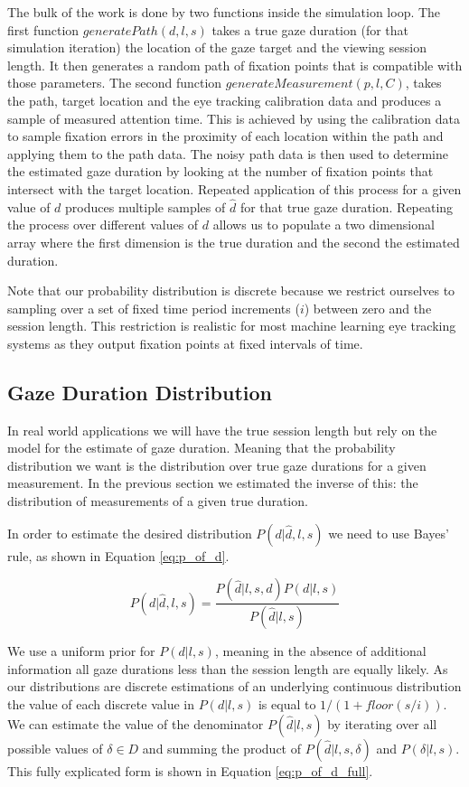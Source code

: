 \documentclass[sigconf]{acmart}
\numberwithin{equation}{section}
\begin{document}
The bulk of the work is done by two functions inside the simulation loop. The first function
$generatePath(d,l,s)$ takes a true gaze duration (for that simulation iteration) the location
of the gaze target and the viewing session length. It then
generates a random path of fixation points that is compatible with those parameters.
The second function 
$generateMeasurement(p,l,C)$, takes the path, target location and the eye tracking calibration 
data and produces a sample of measured attention time.
This is achieved by using the calibration data to sample
fixation errors in the proximity of each location within the path and applying them to the path data. 
The noisy path data is then used to determine
the estimated gaze duration by looking at the number of fixation points that intersect with the target
location.
Repeated application of this process for a given value of $d$ produces multiple samples of $\hat{d}$
for that true gaze duration. Repeating the process over different 
values of $d$ allows us to populate a two dimensional array where the first dimension is the
true duration and the second the estimated duration. 

Note that our probability distribution is discrete
because we restrict ourselves to sampling over a set of fixed time period increments ($i$) 
between zero and the session length. This restriction is realistic for most machine learning
eye tracking systems as they output fixation points at fixed intervals of time.

\subsection{Gaze Duration Distribution}

In real world applications we will have the true session length but rely on the model for the 
estimate of gaze duration. Meaning that the probability distribution we want is the distribution 
over true gaze durations for a given measurement. In the previous section we estimated the inverse of
this: the distribution of measurements of a given true duration. 

In order to estimate the desired distribution $P(d|\hat{d},l,s)$ we need to use 
Bayes' rule, as shown in Equation \ref{eq:p_of_d}.

\begin{equation}
\label{eq:p_of_d}
P(d|\hat{d},l,s) =  \frac{ P(\hat{d}|l,s,d) P(d|l,s) }{ P(\hat{d}|l,s)  }
\end{equation}

We use a uniform prior for $P(d|l,s)$, meaning in the absence of additional information all
gaze durations less than the session length are equally likely. As our distributions are
discrete estimations of an underlying continuous distribution the value of each discrete
value in $P(d|l,s)$ is
equal to $1/(1+floor(s/i))$. We can estimate the value
of the denominator $P(\hat{d}|l,s)$ by iterating over all possible values of $\delta \in D$ 
and summing the product of $P(\hat{d}|l,s,\delta)$ and $P(\delta|l,s)$. 
This fully explicated form is shown in Equation \ref{eq:p_of_d_full}.
\end{document}
